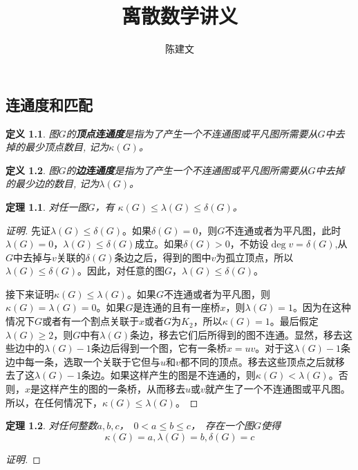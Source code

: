 \documentclass{book}[oneside]
\newtheorem{Def}{定义}[chapter]
\newtheorem{Thm}{定理}[chapter]
\begin{document}
\begin{CJK*}{UTF8}{gbsn}
  \title{离散数学讲义}
  \author{陈建文}
  \maketitle
  


  \setcounter{chapter}{7}
  \chapter{连通度和匹配}
  \begin{Def}
    图$G$的{\bfseries 顶点连通度}是指为了产生一个不连通图或平凡图所需要从$G$中去掉的最少顶点数目, 记为$\kappa (G)$。
  \end{Def}

  \begin{Def}
    图$G$的{\bfseries 边连通度}是指为了产生一个不连通图或平凡图所需要从$G$中去掉的最少边的数目, 记为$\lambda (G)$。
  \end{Def}
  \begin{Thm}
    对任一图$G$，有 $\kappa (G) \leq \lambda (G) \leq \delta (G)$。
  \end{Thm}
  \begin{proof}[证明]
    先证$\lambda (G) \leq \delta (G)$。如果$\delta(G) = 0$，则$G$不连通或者为平凡图，此时$\lambda(G) = 0$，$\lambda(G)\leq \delta(G)$成立。如果$\delta(G)>0$，不妨设$\deg v = \delta(G)$,从$G$中去掉与$v$关联的$\delta(G)$条边之后，得到的图中$v$为孤立顶点，所以$\lambda(G) \leq \delta(G)$。因此，对任意的图$G$，$\lambda(G)\leq \delta(G)$。

    接下来证明$\kappa (G) \leq \lambda (G)$。如果$G$不连通或者为平凡图，则$\kappa(G)=\lambda(G)=0$。如果$G$是连通的且有一座桥$x$，则$\lambda(G)=1$。因为在这种情况下$G$或者有一个割点关联于$x$或者$G$为$K_2$，所以$\kappa(G)=1$。最后假定$\lambda(G)\geq 2$，则$G$中有$\lambda(G)$条边，移去它们后所得到的图不连通。显然，移去这些边中的$\lambda(G)-1$条边后得到一个图，它有一条桥$x=uv$。对于这$\lambda(G)-1$条边中每一条，选取一个关联于它但与$u$和$v$都不同的顶点。移去这些顶点之后就移去了这$\lambda(G)-1$条边。如果这样产生的图是不连通的，则$\kappa(G) < \lambda(G)$。否则，$x$是这样产生的图的一条桥，从而移去$u$或$v$就产生了一个不连通图或平凡图。所以，在任何情况下，$\kappa(G) \leq \lambda(G)$。
  \end{proof}

    \begin{Thm}
    对任何整数$a,b,c$，　$0 < a \leq b \leq c$，　存在一个图$G$使得\[\kappa (G)
      = a, \lambda (G) = b, \delta (G) = c\]
  \end{Thm}
  \begin{proof}[证明]



\end{proof}
\end{CJK*}
\end{document}
